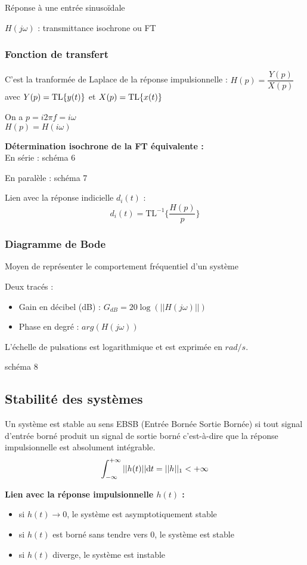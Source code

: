 \documentclass[a4paper,12pt]{report}
\begin{document}
Réponse à une entrée sinusoïdale

$H(j\omega)$ : transmittance isochrone ou FT

\subsubsection{Fonction de transfert}

C'est la tranformée de Laplace de la réponse impulsionnelle :
$H(p) = \dfrac{Y(p)}{X(p)}$ avec $Y(p) = \mathrm{TL} \{ y(t) \}$ et $X(p) = \mathrm{TL} \{ x(t) \}$

On a $p = i2\pi f = i\omega$ \\
$H(p) = H(i\omega)$

\textbf{Détermination isochrone de la FT équivalente :} \\

En série :
{\Large schéma 6}

En paralèle :
{\Large schéma 7}

Lien avec la réponse indicielle $d_i(t)$ :
\[ d_i(t) = \mathrm{TL}^{-1}\{ \frac{H(p)}{p} \} \]

\subsubsection{Diagramme de Bode}

Moyen de représenter le comportement fréquentiel d'un système

Deux tracés :
\begin{itemize}
    \item Gain en décibel (dB) : $G_{dB} = 20 \log (|| H(j\omega) ||)$
    \item Phase en degré : $arg(H(j\omega))$
\end{itemize}

L'échelle de pulsations est logarithmique et est exprimée en $rad/s$.

{\Large schéma 8}

\subsection{Stabilité des systèmes}

Un système est stable au sens EBSB (Entrée Bornée Sortie Bornée) si tout signal d'entrée borné produit un signal de sortie borné c'est-à-dire que la réponse impulsionnelle est absolument intégrable.
\[ \int_{-\infty}^{+\infty} ||h(t)|| \mathrm{d}t = ||h||_1 < +\infty \]

\textbf{Lien avec la réponse impulsionnelle $h(t)$ :}
\begin{itemize}
    \item si $h(t) \to 0$, le système est asymptotiquement stable
    \item si $h(t)$ est borné sans tendre vers $0$, le système est stable
    \item si $h(t)$ diverge, le système est instable
\end{itemize}
\end{document}
